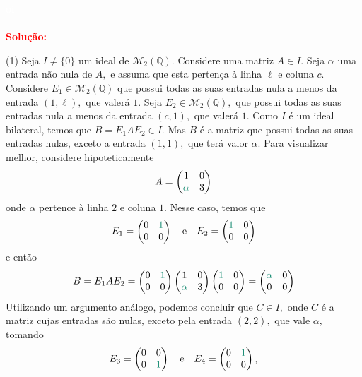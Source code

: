 \documentclass[11pt,a4paper]{article}
\newcommand{\dividiritens}[1]{\begin{tasks}[counter-format={(tsk[a])},label-width=3.6ex, label-format = {\bfseries}, column-sep = {0pt}](1) #1 \end{tasks}}
\newcommand{\pers}[1]{\textcolor{Floresta}{$\negrito{(#1)} $}}
\newcommand{\solucao}[1]{
\textbf{\textcolor{white}{oi}\\ \\ \textcolor{red}{Solução:}} #1}
\begin{document}
\solucao{
\dividiritens{
\task[\pers{a}] Seja $I \neq \{ 0 \}$ um ideal de $\mathcal{M}_2(\mathbb{Q}).$ Considere uma matriz $A \in I. $ Seja $\alpha$ uma entrada não nula de $A,$ e assuma que esta pertença à linha $\ell$ e coluna $c.$ Considere $E_1 \in \mathcal{M}_2(\mathbb{Q})$ que possui todas as suas entradas nula a menos da entrada $(1, \ell),$ que valerá $1.$ Seja $E_2 \in \mathcal{M}_2(\mathbb{Q}),$ que possui todas as suas entradas nula a menos da entrada $(c, 1),$ que valerá $1.$ Como $I$ é um ideal bilateral, temos que $B = E_1AE_2 \in I.$ Mas $B$ é a matriz que possui todas as suas entradas nulas, exceto a entrada $(1,1),$ que terá valor $\alpha.$ Para visualizar melhor, considere hipoteticamente
\[
A = \begin{pmatrix} 1 & 0 \\ \textcolor{PineGreen}{\alpha} & 3 \end{pmatrix}
\]
onde $\alpha$ pertence à linha $2$ e coluna $1.$ Nesse caso, temos que
\[
E_1 = \begin{pmatrix} 0 & \textcolor{PineGreen}{1} \\ 0 & 0 \end{pmatrix} \quad \mbox{e} \quad E_2 = \begin{pmatrix}  \textcolor{PineGreen}{1} & 0 \\ 0 & 0 \end{pmatrix}
\]
e então
\[
B = E_1AE_2 = \begin{pmatrix} 0 & \textcolor{PineGreen}{1} \\ 0 & 0 \end{pmatrix} \begin{pmatrix} 1 & 0 \\ \textcolor{PineGreen}{\alpha} & 3 \end{pmatrix} \begin{pmatrix}  \textcolor{PineGreen}{1} & 0 \\ 0 & 0 \end{pmatrix} = \begin{pmatrix} \textcolor{PineGreen}{\alpha} & 0 \\ 0 & 0 \end{pmatrix}
\]
Utilizando um argumento análogo, podemos concluir que $C \in I,$ onde $C$ é a matriz cujas entradas são nulas, exceto pela entrada $(2,2),$ que vale $\alpha,$ tomando 
\[
E_3 = \begin{pmatrix} 0 & 0 \\ 0 & \textcolor{PineGreen}{1} \end{pmatrix} \quad \mbox{e} \quad E_4 = \begin{pmatrix}  0 & \textcolor{PineGreen}{1} \\ 0 & 0 \end{pmatrix},
\]}}
\end{document}
